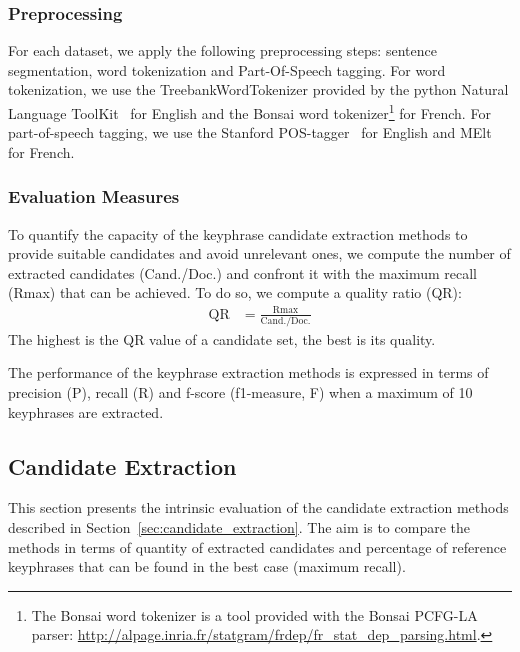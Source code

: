     \subsubsection{Preprocessing}
    \label{subsubsec:preprocessing}
      For each dataset, we apply the following preprocessing steps: sentence
      segmentation, word tokenization and Part-Of-Speech tagging. For word
      tokenization, we use the TreebankWordTokenizer provided by the python
      Natural Language ToolKit~\cite{bird2009nltk} for English and the Bonsai
      word tokenizer\footnote{The Bonsai word tokenizer is a tool provided with
      the Bonsai PCFG-LA parser:
      \url{http://alpage.inria.fr/statgram/frdep/fr_stat_dep_parsing.html}.} for
      French. For part-of-speech tagging, we use the Stanford
      POS-tagger~\cite{toutanova2003stanfordpostagger} for English and
      MElt~\cite{denis2009melt} for French.

    \subsubsection{Evaluation Measures}
    \label{subsubsec:keyphrase_extraction_evaluation_measures}
      To quantify the capacity of the keyphrase candidate extraction methods to
      provide suitable candidates and avoid unrelevant ones, we compute the
      number of extracted candidates (Cand./Doc.) and confront it with the
      maximum recall (Rmax) that can be achieved. To do so, we compute a quality
      ratio (QR):
      \begin{align}
        \text{QR} &= \frac{\text{Rmax}}{\text{Cand./Doc.}}
      \end{align}
      The highest is the QR value of a candidate set, the best is its quality.

      The performance of the keyphrase extraction methods is expressed in terms
      of precision (P), recall (R) and f-score (f1-measure, F) when a maximum of
      10 keyphrases are extracted.

  \subsection{Candidate Extraction}
  \label{subsec:candidate_extraction}

    This section presents the intrinsic evaluation of the candidate extraction
    methods described in Section~\ref{sec:candidate_extraction}. The aim is to
    compare the methods in terms of quantity of extracted candidates and
    percentage of reference keyphrases that can be found in the best case
    (maximum recall).

